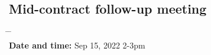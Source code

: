 \documentclass[10pt,a4paper,titlepage,parskip]{scrartcl}
\begin{document}
\subsection{Mid-contract follow-up meeting}
\vspace*{-0.5cm}
\begin{tabbing}
	\hspace{2.8cm} \= \hspace{4cm} \= \kill \\
	\textbf{Date and time:} 	\> Sep 15, 2022 2-3pm\\
\end{tabbing}
\vspace*{-0.5cm}

%
\pagebreak
\end{document}

